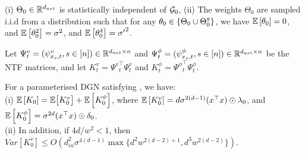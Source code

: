 \begin{assumption}\label{assmp:main}
(i) $\Theta_0\in\mathbb{R}^{d_{net}}$ is statistically independent of $\mathcal{G}_0$, (ii) The weights $\Theta_0$ are sampled i.i.d from a distribution such that for any $\theta_0\in\{\Theta_0\cup {\Theta}^g_0\}$,  we have $\mathbb{E}\left[\theta_0\right]=0$, and  $\mathbb{E}\left[\theta^2_0\right]=\sigma^2$, and $\mathbb{E}\left[\theta^4_0\right]={\sigma'}^2$.
\end{assumption}
\begin{comment}
\begin{lemma}\label{lm:disentangle}[Disentanglement] Let $\nabla_{\Theta} v_t\in \R^{P\times d_{net}}$ be matrix whose entries are given by $\nabla_{\Theta} v_t (p,\theta)=\partial_{\theta}v_t(p),\forall p\in [P], \theta\in\Theta$, and let $I_P$ be the $P\times P$ identity matrix. Then, 
under \Cref{assmp:main}-(ii), it follows that $\E{\nabla_{\Theta}v_{\Theta_t})(\nabla_{\Theta}v_{\Theta_t})^\top }= d\sigma^{2(d-1)}I_{P}$.
\end{lemma}
\end{comment}
Let $\Psi^v_t=(\psi^v_{x_s,t},s\in[n])\in\mathbb{R}^{d_{net}\times n}$ and $\Psi^{\phi}_t=(\psi^{\phi}_{x_s,t},s\in[n])\in\mathbb{R}^{d_{net}\times n}$ be the NTF matrices, and let $K^v_t={\Psi^{v}}^\top_t\Psi^v_t$ and $K^{\phi}_t={\Psi^{\phi}}^\top_t\Psi^{\phi}_t$. 
\begin{theorem}\label{th:main} For a parameterised DGN satisfying , we have:\\
(i) $\mathbb{E}\left[K_0\right]=\mathbb{E}\big[K^v_0\big]+\mathbb{E}\left[K^{\phi}_0\right]$, where $\mathbb{E}\left[K^{v}_0\right]=d\sigma^{2(d-1)} (x^\top x)\odot \lambda_0$, and $\mathbb{E}\left[K^{\phi}_0\right]=\sigma^{2d}  (x^\top x)\odot \delta_0$.\\
(ii) In addition, if ${4d}/{w^2}<1$, then $Var\left[K^v_0\right]\leq O\left(d^2_{in}\sigma^{4(d-1)}\max\{d^2w^{2(d-2)+1}, d^3w^{2(d-2)}\}\right)$.
\end{theorem}


